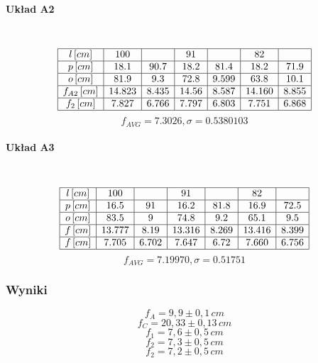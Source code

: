 \documentclass[a4paper, 11pt]{article}
\begin{document}

\paragraph{Układ A2}\label{par:paragraph_name} %
\mbox{} \\
\[
	\begin{array}{|c|c|c|c|c|c|c|c|c|}
		\hline
		l \, [cm]      & 100    & ~     & 91    & ~     & 82     & ~     \\ \hline
		p \, [cm]      & 18.1   & 90.7  & 18.2  & 81.4  & 18.2   & 71.9  \\ \hline
		o \, [cm]      & 81.9   & 9.3   & 72.8  & 9.599 & 63.8   & 10.1  \\ \hline
		f_{A2} \, [cm] & 14.823 & 8.435 & 14.56 & 8.587 & 14.160 & 8.855 \\ \hline
		f_2 \, [cm]    & 7.827  & 6.766 & 7.797 & 6.803 & 7.751  & 6.868 \\ \hline
	\end{array}
\]
$$f_{AVG} = 7.3026 , \sigma = 0.5380103 $$


\paragraph{Układ A3}\label{par:paragraph_name} %
\mbox{} \\
\[
	\begin{array}{|c|c|c|c|c|c|c|c|c|}

		\hline
		l \, [cm] & 100    & ~     & 91     & ~     & 82     & ~     \\ \hline
		p \, [cm] & 16.5   & 91    & 16.2   & 81.8  & 16.9   & 72.5  \\ \hline
		o \, [cm] & 83.5   & 9     & 74.8   & 9.2   & 65.1   & 9.5   \\ \hline
		f \, [cm] & 13.777 & 8.19  & 13.316 & 8.269 & 13.416 & 8.399 \\ \hline
		f \, [cm] & 7.705  & 6.702 & 7.647  & 6.72  & 7.660  & 6.756 \\ \hline
	\end{array}
\]
$$f_{AVG} = 7.19970 , \sigma = 0.51751 $$



\subsubsection{Wyniki}\label{sec:wyniki} %
\Large
\[
	f_A = 9,9 \pm 0,1 \, cm
\]
\[
	f_C = 20,33 \pm 0,13  \, cm
\]
\[
	f_1 = 7,6 \pm 0,5  \, cm
\]
\[
	f_2 = 7,3 \pm 0,5  \, cm
\]
\[
	f_2 = 7,2 \pm 0,5  \, cm
\]
\normalsize
\end{document}

